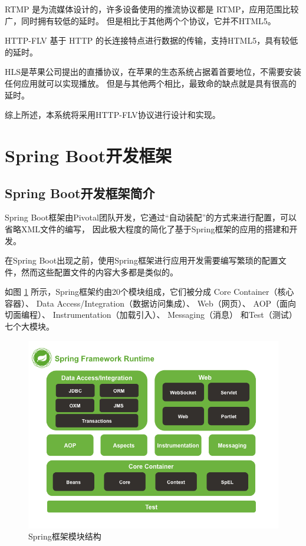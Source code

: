 RTMP 是为流媒体设计的，许多设备使用的推流协议都是 RTMP，应用范围比较广，同时拥有较低的延时。
但是相比于其他两个个协议，它并不HTML5。

HTTP-FLV 基于 HTTP 的长连接特点进行数据的传输，支持HTML5，具有较低的延时。


HLS是苹果公司提出的直播协议，在苹果的生态系统占据着首要地位，不需要安装任何应用就可以实现播放。
但是与其他两个相比，最致命的缺点就是具有很高的延时。

综上所述，本系统将采用HTTP-FLV协议进行设计和实现。

\section{Spring Boot开发框架}
\subsection{Spring Boot开发框架简介}
Spring Boot框架由Pivotal团队开发，它通过“自动装配”的方式来进行配置，可以省略XML文件的编写，
因此极大程度的简化了基于Spring框架的应用的搭建和开发。


在Spring Boot出现之前，使用Spring框架进行应用开发需要编写繁琐的配置文件，然而这些配置文件的内容大多都是类似的。

如图 \ref{Fig:spring} 所示，Spring框架约由20个模块组成，它们被分成
Core Container（核心容器）、
Data Access/Integration（数据访问集成）、
Web（网页）、
AOP（面向切面编程）、
Instrumentation（加载引入）、
Messaging（消息）
和Test（测试）七个大模块。

\begin{figure}[ht]
    \centering
    \includegraphics[width=0.8\linewidth]{./Figure/IMG_spring.png}
    \caption{Spring框架模块结构}
    \label{Fig:spring}
\end{figure}

